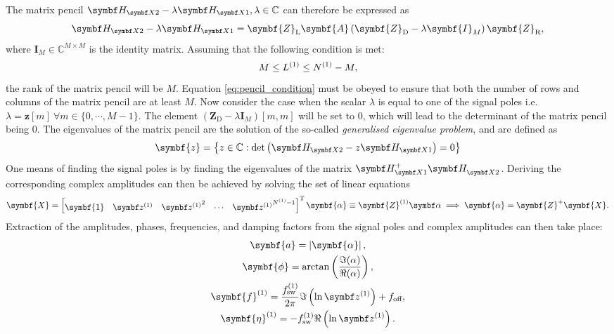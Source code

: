 The matrix pencil $\HXtwo - \lambda\HXone, \lambda \in \mathbb{C}$ can
therefore be expressed as
\begin{equation}
    \HXtwo - \lambda \HXone = \symbf{Z}_{\text{L}} \symbf{A} \left(
        \symbf{Z}_{\text{D}} - \lambda \symbf{I}_M
    \right) \symbf{Z}_{\text{R}},
\end{equation}
where $\symbf{I}_M \in \mathbb{C}^{M \times M}$ is the identity matrix.
Assuming that the following condition is met:
\begin{equation}
    M \leq L^{(1)} \leq N^{(1)} - M,\label{eq:pencil_condition}
\end{equation}
the rank of the matrix pencil will be $M$. Equation \ref{eq:pencil_condition}
must be obeyed to ensure that both the number of rows and columns of the matrix
pencil are at least $M$. Now consider the case when the scalar $\lambda$ is
equal to one of the signal poles i.e.  $\lambda = \symbf{z}[m]\ \forall m \in
\lbrace 0, \cdots, M-1 \rbrace$. The element $\left(\symbf{Z}_{\text{D}} -
\lambda \symbf{I}_M\right) [m, m]$ will be set to $0$, which will lead to the
determinant of the matrix pencil being $0$. The eigenvalues of the matrix
pencil are the solution of the so-called \emph{generalised eigenvalue problem},
and are defined as\cite[Section 7.7]{Golub2013}
\begin{equation}
    \symbf{z} = \left\lbrace
        z \in \mathbb{C} : \det\left(\HXtwo - z \HXone\right) = 0
    \right\rbrace
\end{equation}
One means of finding the signal poles is by finding the eigenvalues of the
matrix $\HXone^+ \HXtwo^{\vphantom{+}}$. Deriving the corresponding complex
amplitudes can then be achieved by solving the set of linear equations
\begin{equation}
    \symbf{X} =
    \begin{bmatrix}
        \symbf{1} &
        {\bdzone} &
        {\bdzone}^2 &
        \cdots &
        {\bdzone}^{\None - 1}
    \end{bmatrix}\T
    \symbf{\alpha} \equiv \symbf{Z}^{(1)} \bdalpha \implies
    \symbf{\alpha} = \symbf{Z}^+ \symbf{X}.
\end{equation}
Extraction of the amplitudes, phases, frequencies, and damping factors from the
signal poles and complex amplitudes can then take place:
\begin{subequations}
    \begin{gather}
        \symbf{a} = \left \lvert \symbf{\alpha} \right \rvert,\\
        \symbf{\phi} = \arctan \left(\frac{\Im (\alpha)}{\Re(\alpha)}\right),\\
        \symbf{f}^{(1)} = \frac{\fswone}{2 \pi} \Im\left(\ln \bdzone \right) + \foff, \\
        \symbf{\eta}^{(1)} = -\fswone \Re\left(\ln \bdzone\right).
    \end{gather}
\end{subequations}

